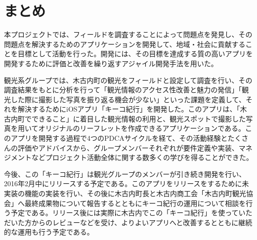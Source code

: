\section{まとめ}
本プロジェクトでは、フィールドを調査することによって問題点を発見し、その問題点を解決するためのアプリケーションを開発して、地域・社会に貢献することを目標として活動を行った。開発には、その目標を達成する質の高いアプリを開発するために評価と改善を繰り返すアジャイル開発手法を用いた。\\
\par 観光系グループでは、木古内町の観光をフィールドと設定して調査を行い、その調査結果をもとに分析を行って「観光情報のアクセス性改善と魅力の発信」「観光した際に撮影した写真を振り返る機会が少ない」といった課題を定義して、それを解決するためにiOSアプリ「キーコ紀行」を開発した。このアプリは、「木古内町でできること」に着目した観光情報の利用と、観光スポットで撮影した写真を用いてオリジナルのリーフレットを作成できるアプリケーションである。このアプリを開発する過程で4つのPDCAサイクルを経て、その活動経験とたくさんの評価やアドバイスから、グループメンバーそれぞれが要件定義や実装、マネジメントなどプロジェクト活動全体に関する数多くの学びを得ることができた。\\
\par 今後、この「キーコ紀行」は観光グループのメンバーが引き続き開発を行い、2016年2月中にリリースする予定である。このアプリをリリースをするために未実装の機能の実装を行い、その後に木古内町長と木古内商工会「木古内町観光協会」へ最終成果物について報告するとともにキーコ紀行の運用について相談を行う予定である。リリース後には実際に木古内でこの「キーコ紀行」を使っていただいた方からのレビューなどを受け、よりよいアプリへと改善するとともに継続的な運用も行う予定である。
